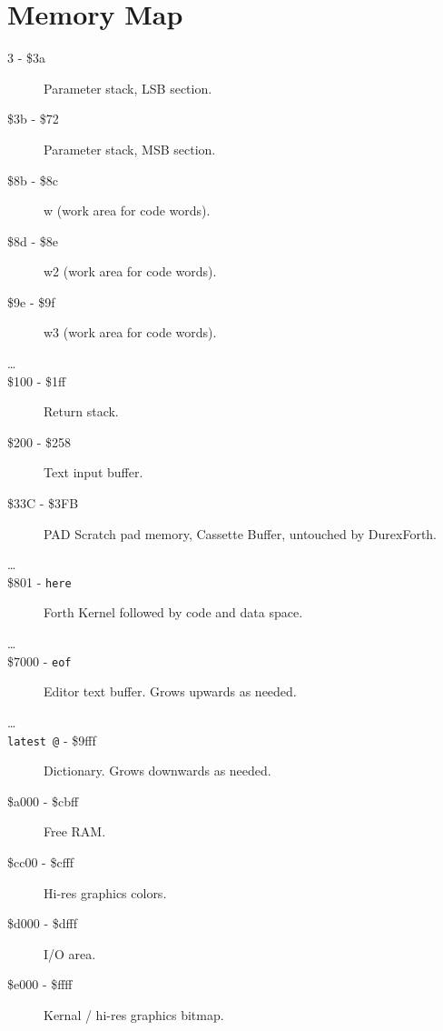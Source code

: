 \chapter{Memory Map}

\begin{description}
\item[3 - \$3a] Parameter stack, LSB section.
\item[\$3b - \$72] Parameter stack, MSB section.
\item[\$8b - \$8c] w (work area for code words).
\item[\$8d - \$8e] w2 (work area for code words).
\item[\$9e - \$9f] w3 (work area for code words).
\item[\ldots]
\item[\$100 - \$1ff] Return stack.
\item[\$200 - \$258] Text input buffer.
\item[\$33C - \$3FB] PAD Scratch pad memory, Cassette Buffer, untouched by DurexForth. 
\item[\ldots]
\item[\$801 - \texttt{here}] Forth Kernel followed by code and data space.
\item[\ldots]
\item[\$7000 - \texttt{eof}] Editor text buffer. Grows upwards as needed.
\item[\ldots]
\item[\texttt{latest @} - \$9fff] Dictionary. Grows downwards as needed.
\item[\$a000 - \$cbff] Free RAM.
\item[\$cc00 - \$cfff] Hi-res graphics colors.
\item[\$d000 - \$dfff] I/O area. 
\item[\$e000 - \$ffff] Kernal / hi-res graphics bitmap.

\end{description}

